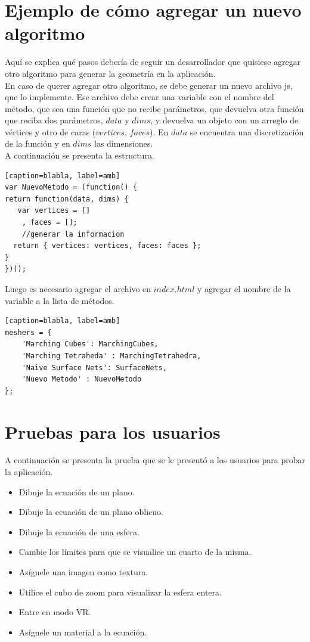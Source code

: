 \documentclass[12pt]{article}
\begin{document}
\section{Ejemplo de cómo agregar un nuevo algoritmo}
Aquí se explica qué pasos debería de seguir un desarrollador que quisiese agregar otro algoritmo para generar la geometría en la aplicación.
\\En caso de querer agregar otro algoritmo, se debe generar un nuevo archivo js, que lo implemente. Ese archivo debe crear una variable con el nombre del método, que sea una función que no recibe parámetros, que devuelva otra función que reciba dos parámetros, $data$ y $dims$, y devuelva un objeto con un arreglo de vértices y otro de caras ($vertices$, $faces$). En $data$ se encuentra una discretización de la función y en $dims$ las dimensiones.
\\A continuación se presenta la estructura.
\begin{lstlisting}[frame=single][caption=blabla, label=amb]
var NuevoMetodo = (function() {
return function(data, dims) {   
   var vertices = []
    , faces = [];
    //generar la informacion
  return { vertices: vertices, faces: faces };
}
})();
\end{lstlisting}
Luego es necesario agregar el archivo en $index.html$ y agregar el nombre de la variable a la lista de métodos.
\begin{lstlisting}[frame=single][caption=blabla, label=amb]
meshers = {
    'Marching Cubes': MarchingCubes,
    'Marching Tetraheda' : MarchingTetrahedra,
    'Naive Surface Nets': SurfaceNets,
    'Nuevo Metodo' : NuevoMetodo
};
\end{lstlisting}
\clearpage
\section{Pruebas para los usuarios}
A continuación se presenta la prueba que se le presentó a los usuarios para probar la aplicación.
\begin{itemize}
\item Dibuje la ecuación de un plano.
\item Dibuje la ecuación de un plano oblicuo.
\item Dibuje la ecuación de una esfera.
\item Cambie los límites para que se visualice un cuarto de la misma.
\item Asígnele una imagen como textura.
\item Utilice el cubo de zoom para visualizar la esfera entera.
\item Entre en modo VR.
\item Asígnele un material a la ecuación.
\end{itemize}
\clearpage
\end{document}
